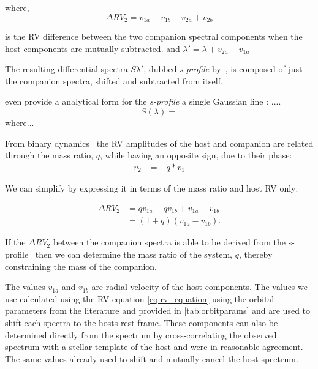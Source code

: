 where,
\begin{equation}
\Delta {RV}_2 = v_{1a} - v_{1b} - v_{2a} + v_{2b} \label{eqn:companion_difference}
\end{equation}

is the {RV} difference between the two companion spectral components when the host components are mutually subtracted.
and \(\lambda' = \lambda + v_{2a}-v_{1a}\)

The resulting differential spectra \(S{\lambda'}\), dubbed \emph{s-profile} by~\citet{ferluga_separating_1997}, is composed of just the companion spectra, shifted and subtracted from itself.

\cite{ferluga_separating_1997} even provide a analytical form for the \emph{s-profile} a single Gaussian line :
 ....\begin{equation}
 S(\lambda) = 
 \end{equation}
where...


From binary dynamics~\citep[e.g.,][]{murray_keplerian_2010} the {RV} amplitudes of the host and companion are related through the mass ratio, \(q\), while having an opposite sign, due to their phase:
\begin{align}
v_{2} &= -q * v_{1} \label{eqn:q_relation}
\end{align}

We can simplify  by expressing it in terms of the mass ratio and host {RV} only:

\begin{align}
\Delta RV_2 &= q v_{1a} - q v_{1b} + v_{1a} - v_{1b} \nonumber \\
&= (1 + q)(v_{1a} - v_{1b}). \label{eqn:companion_difference_simplified}
\end{align}

If the \(\Delta {RV}_2\) between the companion spectra is able to be derived from the s-profile~\citep[see][]{ferluga_separating_1997} then we can determine the mass ratio of the system, \(q\), thereby constraining the mass of the companion.

The values \(v_{1a}\) and \(v_{1b}\) are radial velocity of the host components. The values we use calculated using the RV equation \ref{eq:rv_equation} using the orbital parameters from the literature and provided in \ref{tab:orbitparams} and are used to shift each spectra to the hosts rest frame. These components can also be determined directly from the spectrum by cross-correlating the observed spectrum with a stellar template of the host and were in reasonable agreement. The same values already used to shift and mutually cancel the host spectrum.

